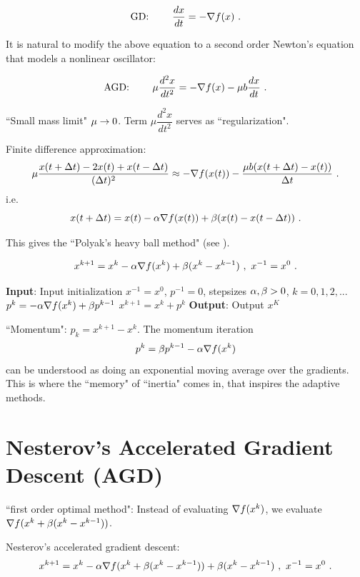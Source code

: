$$\text{GD: } \qquad \dfrac{dx}{dt}=-\nabla f(x) \ .$$

It is natural to modify the above equation to a second order Newton's equation that models a nonlinear oscillator:

$$\text{AGD: } \qquad  \mu\dfrac{d^2 x}{dt^2}=-\nabla f(x)-\mu b\dfrac{dx}{dt} \ .$$

``Small mass limit" $\mu\rightarrow 0$. Term $\mu \dfrac{d^2 x}{dt^2}$ serves as ``regularization".

Finite difference approximation:
$$\mu\dfrac{x(t+\Dt t)-2x(t)+x(t-\Dt t)}{(\Dt t)^2}\approx -\grad f(x(t))-\dfrac{\mu b (x(t+\Dt t)-x(t))}{\Dt t} \ .$$
i.e.
$$x(t+\Delta t)=x(t)-\alpha \nabla f(x(t))+\beta(x(t)-x(t-\Delta t)) \ .$$

This gives the ``Polyak's heavy ball method" (see \cite{PolyakHeavyBall1964}).

$$x^{k+1}=x^k-\alpha \nabla f(x^k)+\beta (x^k-x^{k-1}) \ , \ x^{-1}=x^0 \ .$$

\begin{algorithm}[H]
\caption{Polyak's heavy ball method (GD with momentum)}
\label{Alg:PolyakHeavyBall}
\begin{algorithmic}[1]
\STATE \textbf{Input}: Input initialization $x^{-1}=x^0$, $p^{-1}=0$, stepsizes $\alpha, \beta>0$, $k=0,1,2,...$
    \STATE $p^k=-\alpha \nabla f(x^k)+\beta p^{k-1}$
    \STATE $x^{k+1}=x^k+p^k$
\ENDFOR
\STATE \textbf{Output}: Output $x^K$
\end{algorithmic}
\end{algorithm}

``Momentum": $p_k=x^{k+1}-x^{k}$. The momentum iteration $$p^k=\beta p^{k-1}-\alpha\nabla f(x^k)$$ can be understood as doing an exponential moving average over the gradients. This is where the ``memory" of ``inertia" comes in, that inspires the adaptive methods.

\section{Nesterov's Accelerated Gradient Descent (AGD)}

``first order optimal method": Instead of evaluating $\nabla f(x^k)$, we evaluate $\nabla f(x^k+\beta(x^k-x^{k-1}))$.

Nesterov's accelerated gradient descent:
\begin{equation}\label{Eq:NesterovIterationScheme}
x^{k+1}=x^k-\al \grad f(x^k+\bt (x^k-x^{k-1}))+\bt(x^k-x^{k-1}) \ , \ x^{-1}=x^0 \ .
\end{equation}

